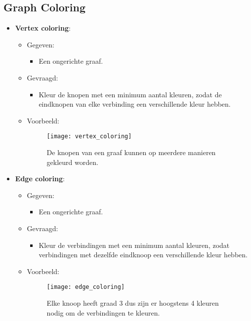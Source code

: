 \subsection{Graph Coloring}
\begin{itemize}
    \item \textbf{Vertex coloring}:
    \begin{itemize}
        \item Gegeven:
        \begin{itemize}
            \item Een ongerichte graaf.
        \end{itemize}
        \item Gevraagd:
        \begin{itemize}
            \item Kleur de knopen met een minimum aantal kleuren, zodat de eindknopen van elke verbinding een verschillende kleur hebben.
        \end{itemize}
        \item Voorbeeld:
        \begin{figure}[ht]
            \centering
            \texttt{[image: vertex\_coloring]}
            \caption{De knopen van een graaf kunnen op meerdere manieren gekleurd worden.}
            \label{fig:vertex_coloring}
        \end{figure}
    \end{itemize}

    \item \textbf{Edge coloring}:
    \begin{itemize}
        \item Gegeven:
        \begin{itemize}
            \item Een ongerichte graaf.
        \end{itemize}
        \item Gevraagd:
        \begin{itemize}
            \item Kleur de verbindingen met een minimum aantal kleuren, zodat verbindingen met dezelfde eindknoop een verschillende kleur hebben.
        \end{itemize}
        \item Voorbeeld:
        \begin{figure}[ht]
            \centering
            \texttt{[image: edge\_coloring]}
            \caption{Elke knoop heeft graad 3 dus zijn er hoogstens 4 kleuren nodig om de verbindingen te kleuren.}
            \label{fig:edge_coloring}
        \end{figure}
    \end{itemize}
    
\end{itemize}

